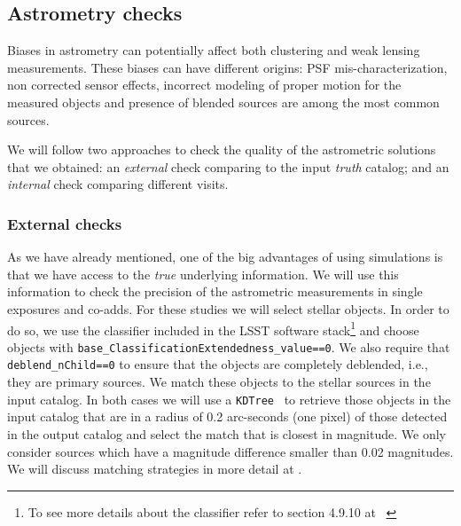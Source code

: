 \documentclass[\docopts]{\docclass}
\begin{document}
\subsection{Astrometry checks}
\label{sec:astrometry_checks}

Biases in astrometry can potentially affect both clustering and weak lensing measurements. These biases can have different origins: PSF mis-characterization, non corrected sensor effects, incorrect modeling of proper motion for the measured objects and presence of blended sources are among the most common sources.

We will follow two approaches to check the quality of the astrometric solutions that we obtained: an \textit{external} check comparing to the input \textit{truth} catalog; and an \textit{internal} check comparing different visits.

\subsubsection{External checks}
\label{sec:external_astrometry}

As we have already mentioned, one of the big advantages of using simulations is that we have access to the \textit{true} underlying information. We will use this information to check the precision of the astrometric measurements in single exposures
and co-adds. For these studies we will select stellar objects. In order to do so, we use the classifier included in the LSST software stack\footnote{To see more details about the classifier refer to section 4.9.10 at ~\citep{2017arXiv170506766B}} and choose objects with \texttt{base\_ClassificationExtendedness\_value==0}.
We also require that \texttt{deblend\_nChild==0} to ensure that the objects are completely deblended, i.e., they are primary sources. We match these objects to the stellar sources in the input catalog. In both cases we will use a \texttt{KDTree}~\citep{scikit-learn} to retrieve those objects in the input catalog that are in a radius of 0.2 arc-seconds (one pixel) of those detected in the output catalog and select the match that is closest in magnitude. We only consider sources which have a magnitude difference smaller than 0.02 magnitudes. We will discuss matching strategies in more detail at .
\end{document}
